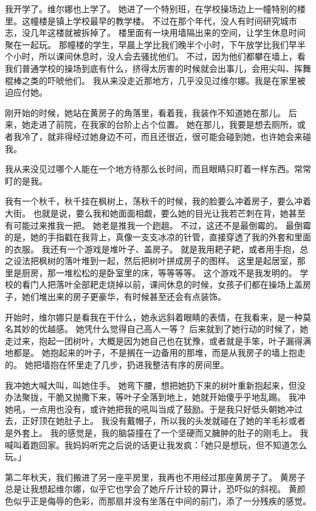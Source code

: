 \documentclass[UTF8]{ctexart}
\begin{document}
我开学了。维尔娜也上学了。
她进了一个特别班，在学校操场边上一幢特别的楼里。这幢楼是镇上学校最早的教学楼。
不过在那个年代，没人有时间研究城市志，没几年这楼就被拆掉了。
楼里面有一块用墙隔出来的空间，让学生休息时间聚在一起玩。
那幢楼的学生，早晨上学比我们晚半个小时，下午放学比我们早半个小时，所以课间休息时，没人会去骚扰他们。
不过，因为他们都攀在墙上，看我们普通学校的操场到底有什么，挤得太厉害的时候就会出事儿，会用尖叫、挥舞棍棒之类的吓唬他们。
我从来没走近那地方，几乎没见过维尔娜。我是在家里被迫应付她。

刚开始的时候，她站在黄房子的角落里，看着我，我装作不知道她在那儿。
后来，她走进了前院，在我家的台阶上占个位置。
她在那儿，我要是想去厕所，或者我冷了，就非得经过她身边不可，而且还很近，很可能会碰到她，也许她会来碰我。

我从来没见过哪个人能在一个地方待那么长时间，而且眼睛只盯着一样东西。常常盯的是我。

我有一个秋千，秋千挂在枫树上，荡秋千的时候，我的脸要么冲着房子，要么冲着大街。
也就是说，要么我和她面面相觑，要么她的目光让我若芒刺在背，她甚至有可能过来推我一把。
她老是推我一个趔趄。
不过，这还不是最倒霉的。
最倒霉的是，她的手指戳在我背上，真像一支支冰凉的针管，直接穿透了我的外套和里面的衣服。
我还有一个游戏是堆叶子、盖房子。
就是我用耙子耙，或者用手抱，总之设法把枫树的落叶堆到一起，然后把树叶拼成房子的图样。
这里是起居室，那里是厨房，那一堆松松的是卧室里的床，等等等等。
这个游戏不是我发明的。
学校的看门人把落叶全部耙走烧掉以前，课间休息的时候，女孩子们都在操场上盖房子，她们堆出来的房子更豪华，有时候甚至还会有点装饰。

开始时，维尔娜只是看我在干什么，她永远斜着眼睛的表情，在我看来，是一种莫名其妙的优越感。
她凭什么觉得自己高人一等？
后来就到了她行动的时候了，她走过来，抱起一团树叶，大概是因为她自己也在犹豫，或者就是手笨，叶子漏得满地都是。
她抱起来的叶子，不是搁在一边备用的那堆，而是从我房子的墙上抱走的。
她把墙抱在怀里走了几步，扔进我整洁有序的房间里。

我冲她大喊大叫，叫她住手。
她弯下腰，想把她扔下来的树叶重新抱起来，但没办法聚拢，干脆又抛撒下来，等叶子全落到地上，她就开始傻乎乎地乱踢。
我冲她吼，一点用也没有，或许她把我的吼叫当成了鼓励。于是我只好低头朝她冲过去，正好顶在她肚子上。
我没有戴帽子，所以我的头发就碰在了她的羊毛衫或者是外套上。
我的感觉是，我的脑袋撞在了一个坚硬而又臃肿的肚子的刚毛上。
我喊叫着跑回家。我妈妈听完之后说的话更让我发疯：「她只是想玩，但不知道怎么玩。」

第二年秋天，我们搬进了另一座平房里，我再也不用经过那座黄房子了。
黄房子总是让我想起维尔娜，似乎它也学会了她斤斤计较的算计，恐吓似的斜视。
黄颜色似乎正是侮辱的色彩，而那扇并没有坐落在中间的前门，添了一分残疾的感觉。
\end{document}
